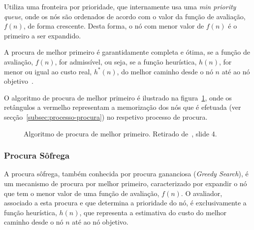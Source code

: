 Utiliza uma fronteira por prioridade, que internamente usa uma \textit{min priority queue}, onde os nós são ordenados de acordo com o valor da função de avaliação, $f(n)$, de forma crescente.
Desta forma, o nó com menor valor de $f(n)$ é o primeiro a ser expandido.

A procura de melhor primeiro é garantidamente completa e ótima, se a função de avaliação, $f(n)$, for admissível, ou seja, se a função heurística, $h(n)$, for menor ou igual ao custo real, $h^*(n)$, do melhor caminho desde o nó $n$ até ao nó objetivo~\cite{ist:leic:resumos:procura-cega}.

O algoritmo de procura de melhor primeiro é ilustrado na figura~\ref{fig:alg-proc-melh-prim}, onde os retângulos a vermelho representam a memorização dos nós que é efetuada (ver secção~\ref{subsec:processo-procura}) no respetivo processo de procura.

\begin{figure}[H]
    \begin{center}
    \end{center}
    \caption{Algoritmo de procura de melhor primeiro. Retirado de~\cite{isel:iasa:slides:proc-espaco-estados-parte-2}, slide 4.}
    \label{fig:alg-proc-melh-prim}
\end{figure}

\subsubsection{Procura Sôfrega}\label{subsubsec:procura-sofrega}

A procura sôfrega, também conhecida por procura gananciosa (\textit{Greedy Search}), é um mecanismo de procura por melhor primeiro, caracterizado por expandir o nó que tem o menor valor de uma função de avaliação, $f(n)$.
O avaliador, associado a esta procura e que determina a prioridade do nó, é exclusivamente a função heurística, $h(n)$, que representa a estimativa do custo do melhor caminho desde o nó $n$ até ao nó objetivo.

